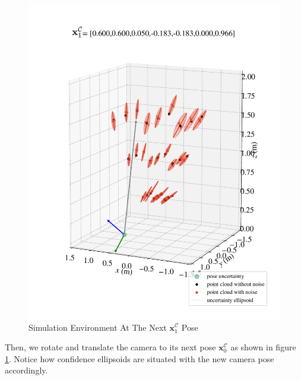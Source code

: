 \documentclass[a4paper]{report}
\numberwithin{figure}{section}
\begin{document}
\begin{figure}[H]
  \centering
  \includegraphics[width=\linewidth,natwidth=640,natheight=640]
  {fig/eva_graphs/sim_at_p1_edit.pdf}
  \caption[Simulation Environment At The Next Pose]
  {Simulation Environment At The Next $\mathbf{x}_1^{\mathcal{C}}$ Pose}
	\label{fig:sim_at_p1}
\end{figure}

Then, we rotate and translate the camera to its next pose 
$\mathbf{x}_0^{\mathcal{C}}$ as shown in figure 
\ref{fig:sim_at_p1}. Notice how confidence ellipsoids are situated with 
the new camera pose accordingly.
\end{document}
